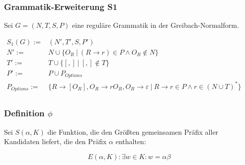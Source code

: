 \documentclass[]{article}
\begin{document}
% 
%     

\subsubsection*{Grammatik-Erweiterung S1}

Sei $G = (N,T,S,P)$ eine reguläre Grammatik in der Greibach-Normalform.


$
\begin{array}{rl}
  S_1(G) :=& (N', T', S, P') \\
  N' :=& N \cup \{ O_R\ |\ (R\rightarrow r)\in P\land O_R \notin N\}\\
  T' :=& T \cup \{[ , ]\ |\ [,]\notin T \}\\
  P' :=& P
  \cup P_{Options} 
  \\
  P_{Options} :=& \{R \rightarrow [O_R], O_R \rightarrow r O_R, O_R \rightarrow \varepsilon \ \vert\ R\rightarrow r\in P
  \land r\in (N\cup T)^*\} \\
\end{array}
$

\subsubsection*{Definition $\phi$}



Sei $S(\alpha,K)$ die Funktion, die den Größten gemeinsamen Präfix aller Kandidaten liefert, die den Präfix $\alpha$ enthalten:

\[ E(\alpha, K) : \exists w\in K: w=\alpha\beta \] 
\end{document}
